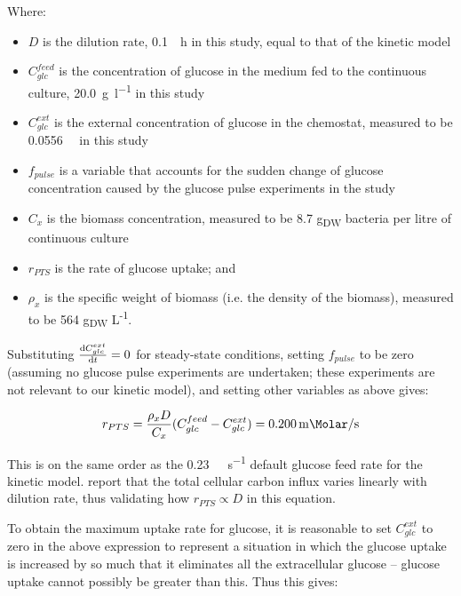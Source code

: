 \documentclass[a4paper, 12pt]{scrartcl}
\begin{document}
{Where:

\begin{itemize}
\item $D$ is the dilution rate, \SI{0.1}{\per\hour} in this study, equal to that of the kinetic model
\item $C_{glc}^{feed}$ is the concentration of glucose in the medium fed to the continuous culture, \SI{20.0}{\gram\per\litre} in this study
\item $C_{glc}^{ext}$ is the external concentration of glucose in the chemostat, measured to be \SI{0.0556}{\milli\Molar} in this study
\item $f_{pulse}$ is a variable that accounts for the sudden change of glucose concentration caused by the glucose pulse experiments in the study
\item $C_{x}$ is the biomass concentration, measured to be 8.7 g\textsubscript{DW} bacteria per litre of continuous culture
\item $r_{PTS}$ is the rate of glucose uptake; and
  \item $\rho_{x}$ is the specific weight of biomass (i.e. the density of the biomass), measured to be 564 g\textsubscript{DW} L\textsuperscript{-1}.
  \end{itemize}

  Substituting $\dv{C_{glc}^{ext}}{t} = 0$ for steady-state conditions, setting $f_{pulse}$ to be zero (assuming no glucose pulse experiments are undertaken; these experiments are not relevant to our kinetic model), and setting other variables as above gives:

\begin{equation}
    r_{PTS} = \frac{\rho_{x}D}{C_{x}}(C_{glc}^{feed} - C_{glc}^{ext}) = \SI{0.200}{\milli\Molar\per\second}
  \end{equation}
  \label{eqn:chassagnole_rearranged}

  This is on the same order as the \SI{0.23}{\milli\Molar\per\second} default glucose feed rate for the kinetic model.  \citet{nanchen_nonlinear_2006} report that the total cellular carbon influx varies linearly with dilution rate, thus validating how $r_{PTS} \propto D$ in this equation.

  To obtain the maximum uptake rate for glucose, it is reasonable to set $C_{glc}^{ext}$ to zero in the above expression to represent a situation in which the glucose uptake is increased by so much that it eliminates all the extracellular glucose -- glucose uptake cannot possibly be greater than this.  Thus this gives:

}
\end{document}
